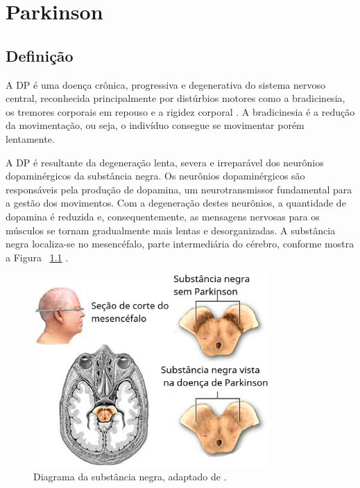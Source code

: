 \chapter{Parkinson}
\section{Definição}

A DP é uma doença crônica, progressiva e degenerativa do sistema nervoso central, reconhecida principalmente por distúrbios motores como a bradicinesia, os tremores corporais em repouso e a rigidez corporal \cite{da2016aspectos}. A bradicinesia é a redução da movimentação, ou seja, o indivíduo consegue se movimentar porém lentamente. 

A DP é resultante da degeneração lenta, severa e irreparável dos neurônios dopaminérgicos da substância negra. Os neurônios dopaminérgicos são responsáveis pela produção de dopamina, um neurotransmissor fundamental para a gestão dos movimentos. Com a degeneração destes neurônios, a quantidade de dopamina é reduzida e, consequentemente, as mensagens nervosas para os músculos se tornam gradualmente mais lentas e desorganizadas. A substância negra localiza-se no mesencéfalo, parte intermediária do cérebro, conforme mostra a Figura ~\ref{substanciaNegra} \cite{eftaxias2015detection}.

\begin{figure}[!htb]
	\centering
	\includegraphics[width=0.8\textwidth]{figuras/subNegra.eps}
	\caption{Diagrama da substância negra, adaptado de .}
	\label{substanciaNegra}
\end{figure}

